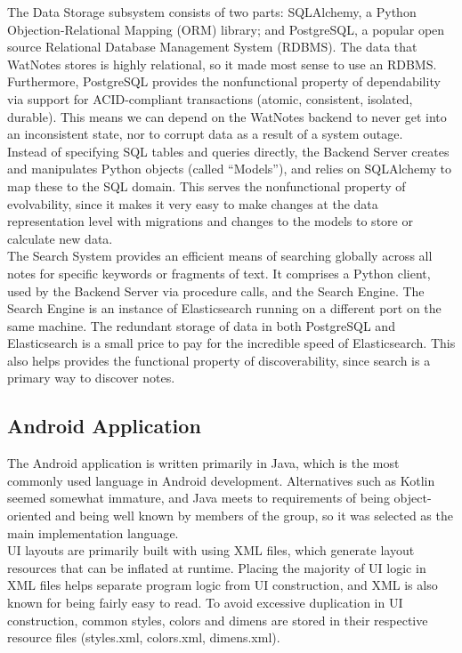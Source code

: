 \documentclass[12pt]{article}
\begin{document}
    The Data Storage subsystem consists of two parts: SQLAlchemy, a Python
    Objection-Relational Mapping (ORM) library; and PostgreSQL, a popular open
    source Relational Database Management System (RDBMS). The data that WatNotes
    stores is highly relational, so it made most sense to use an RDBMS.
    Furthermore, PostgreSQL provides the nonfunctional property of dependability
    via support for ACID-compliant transactions (atomic, consistent, isolated,
    durable). This means we can depend on the WatNotes backend to never get into
    an inconsistent state, nor to corrupt data as a result of a system outage.\\

    Instead of specifying SQL tables and queries directly, the Backend Server
    creates and manipulates Python objects (called ``Models''), and relies on
    SQLAlchemy to map these to the SQL domain. This serves the nonfunctional
    property of evolvability, since it makes it very easy to make changes at the
    data representation level with migrations and changes to the models to store
    or calculate new data.\\

    The Search System provides an efficient means of searching globally across
    all notes for specific keywords or fragments of text. It comprises a Python
    client, used by the Backend Server via procedure calls, and the Search
    Engine. The Search Engine is an instance of Elasticsearch running on a
    different port on the same machine. The redundant storage of data in both
    PostgreSQL and Elasticsearch is a small price to pay for the incredible
    speed of Elasticsearch. This also helps provides the functional property of
    discoverability, since search is a primary way to discover notes.

  \subsection{Android Application}
    The Android application is written primarily in Java, which is the most commonly used
    language in Android development. Alternatives such as Kotlin seemed somewhat immature, and
    Java meets to requirements of being object-oriented and being well known by members of
    the group, so it was selected as the main implementation language. \\

    UI layouts are primarily built with using XML files, which generate layout resources
    that can be inflated at runtime. Placing the majority of UI logic in XML files helps
    separate program logic from UI construction, and XML is also known for being fairly easy to read.
    To avoid excessive duplication in UI construction, common styles, colors and dimens are
    stored in their respective resource files (styles.xml, colors.xml, dimens.xml). \\
\end{document}
